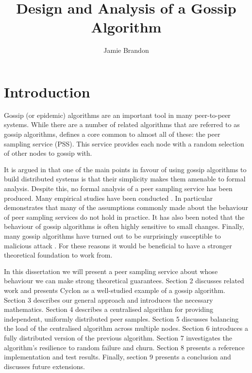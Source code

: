 \documentclass[a4paper,10pt]{article}
\begin{document}
\title{Design and Analysis of a Gossip Algorithm}
\author{Jamie Brandon}
\date{}

\maketitle

\clearpage

\section{Introduction}

Gossip (or epidemic) algorithms are an important tool in many peer-to-peer systems. While there are a number of related algorithms that are referred to as gossip algorithms, \cite{pss} defines a core common to almost all of these: the peer sampling service (PSS). This service provides each node with a random selection of other nodes to gossip with. 

It is argued in \cite{formal_analysis} that one of the main points in favour of using gossip algorithms to build distributed systems is that their simplicity makes them amenable to formal analysis. Despite this, no formal analysis of a peer sampling service has been produced. Many empirical studies have been conducted \cite{pss, formal_analysis}. In particular \cite{pss} demonstrates that many of the assumptions commonly made about the behaviour of peer sampling services do not hold in practice. It has also been noted \cite{pss, arrg, how_robust, emergent_gossip} that the behaviour of gossip algorithms is often highly sensitive to small changes. Finally, many gossip algorithms have turned out to be surprisingly susceptible to malicious attack \cite{poison, poison_buddycast, poison_mosquito, poison_antimosquito}. For these reasons it would be beneficial to have a stronger theoretical foundation to work from.

In this dissertation we will present a peer sampling service about whose behaviour we can make strong theoretical guarantees. Section 2 discusses related work and presents Cyclon as a well-studied example of a gossip algorithm. Section 3 describes our general approach and introduces the necessary mathematics. Section 4 describes a centralised algorithm for providing independent, uniformly distributed peer samples. Section 5 discusses balancing the load of the centralised algorithm across multiple nodes. Section 6 introduces a fully distributed version of the previous algorithm. Section 7 investigates the algorithm's resilience to random failure and churn. Section 8 presents a reference implementation and test results. Finally, section 9 presents a conclusion and discusses future extensions.
\end{document}
